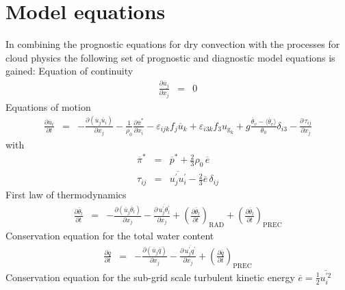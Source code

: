 \documentclass[11pt,a4paper]{scrartcl}
\begin{document}
\section{Model equations}
In combining the prognostic equations for dry convection with the processes for cloud physics the following set of prognostic and diagnostic 
model equations is gained:
\newline
\newline
Equation of continuity
\begin{eqnarray}
 \frac{\partial\overline u_{j}}{\partial x_{j}} & = & 0
 \label{eq:conti}
\end{eqnarray}
Equations of motion
\begin{eqnarray}
 \frac{\partial\overline u_{i}}{\partial t} & = &
  -\frac{\partial \left(\overline u_{j} \overline u_{i}\right)}{\partial x_{j}}  
  -\frac{1}{\rho_{0}}\frac{\partial \overline \pi^{\ast}}{\partial x_{i}} 
  - \varepsilon_{ijk}f_{j}\overline u_{k} + \varepsilon_{i3k}f_{3}u_{\mathrm{g}_{k}}
  + g\frac{\overline\theta_{v}-\langle\overline\theta_{v}\rangle}{\theta_{0}}\delta_{i3} 
  -\frac{\partial\,\tau_{ij}}{\partial x_{j}}
 \label{eq:motion}
\end{eqnarray}
with 
\begin{eqnarray}
 \label{eq:pres}
 \overline \pi^{\ast} & = & \overline p^{\ast} + \frac{2}{3}\rho_{0}\,\overline e \\
 \label{eq:tau}
 \tau_{ij} & = & \overline{u_{j}^{'}u_{i}^{'}} - \frac{2}{3}\overline e\,\delta_{ij} 
\end{eqnarray}
First law of thermodynamics
\begin{eqnarray}
 \frac{\partial\overline \theta_{l}}{\partial t} & = & 
  -\frac{\partial \left(\overline u_{j} \overline \theta_{l}\right)}{\partial x_{j}}
  -\frac{\partial\, \overline{u_{j}^{'}\theta_{l}^{'}}}{\partial x_{j}}  
  +\left(\frac{\partial \overline\theta_{l}}{\partial t}\right)_{\mathrm{RAD}}
  +\left(\frac{\partial \overline\theta_{l}}{\partial t}\right)_{\mathrm{PREC}}
 \label{eq:theta}
\end{eqnarray}
Conservation equation for the total water content
\begin{eqnarray}
 \frac{\partial\overline q}{\partial t} & = & 
  -\frac{\partial \left(\overline u_{j} \overline q\right)}{\partial x_{j}}
  -\frac{\partial\, \overline{u_{j}^{'} q^{'}}}{\partial x_{j}}  
  +\left(\frac{\partial \overline q}{\partial t}\right)_{\mathrm{PREC}}
 \label{eq:total_water}
\end{eqnarray}
Conservation equation for the sub-grid scale turbulent kinetic energy $\overline{e}=\frac{1}{2}\overline{u_{i}^{'2}}$
\end{document}
